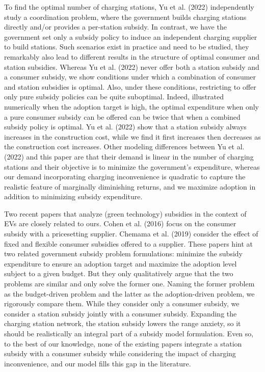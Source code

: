 \documentclass[10pt]{article}
\begin{document}
To find the optimal number of charging stations, Yu et al. (2022) independently study a coordination problem, where the government builds charging stations directly and/or provides a per-station subsidy. In contrast, we have the government set only a subsidy policy to induce an independent charging supplier to build stations. Such scenarios exist in practice and need to be studied, they remarkably also lead to different results in the structure of optimal consumer and station subsidies. Whereas Yu et al. (2022) never offer both a station subsidy and a consumer subsidy, we show conditions under which a combination of consumer and station subsidies is optimal. Also, under these conditions, restricting to offer only pure subsidy policies can be quite suboptimal. Indeed, illustrated numerically when the adoption target is high, the optimal expenditure when only a pure consumer subsidy can be offered can be twice that when a combined subsidy policy is optimal. Yu et al. (2022) show that a station subsidy always increases in the construction cost, while we find it first increases then decreases as the construction cost increases. Other modeling differences between Yu et al. (2022) and this paper are that their demand is linear in the number of charging stations and their objective is to minimize the government's expenditure, whereas our demand incorporating charging inconvenience is quadratic to capture the realistic feature of marginally diminishing returns, and we maximize adoption in addition to minimizing subsidy expenditure.

Two recent papers that analyze (green technology) subsidies in the context of EVs are closely related to ours. Cohen et al. (2016) focus on the consumer subsidy with a pricesetting supplier. Chemama et al. (2019) consider the effect of fixed and flexible consumer subsidies offered to a supplier. These papers hint at two related government subsidy problem formulations: minimize the subsidy expenditure to ensure an adoption target and maximize the adoption level subject to a given budget. But they only qualitatively argue that the two problems are similar and only solve the former one. Naming the former problem as the budget-driven problem and the latter as the adoption-driven problem, we rigorously compare them. While they consider only a consumer subsidy, we consider a station subsidy jointly with a consumer subsidy. Expanding the charging station network, the station subsidy lowers the range anxiety, so it should be realistically an integral part of a subsidy model formulation. Even so, to the best of our knowledge, none of the existing papers integrate a station subsidy with a consumer subsidy while considering the impact of charging inconvenience, and our model fills this gap in the literature.
\end{document}
